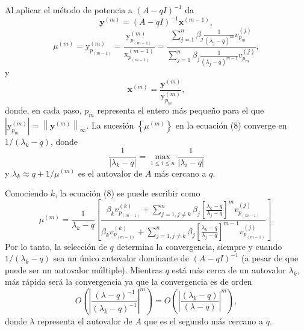 \documentclass{report}
\numberwithin{subsection}{section} %
\begin{document}
Al aplicar el método de potencia a $\left( A - qI \right)^{-1}$ da
\begin{equation*}
\textbf{y}^{\left( m \right)} = \left( A - qI \right)^{-1} \textbf{x}^{\left( m - 1 \right)},
\end{equation*}
\begin{equation}
\mu^{\left( m \right)} = \text{y}_{p_{\left( m - 1 \right)}}^{\left( m \right)} = \frac{\text{y}_{p_{\left( m - 1 \right)}}^{\left( m \right)}}{\text{x}_{p_{\left( m - 1 \right)}}^{\left( m - 1 \right)}} = \frac{\sum_{j=1}^{n} \beta_{j} \frac{1}{\left( \lambda_{j} - q \right)^{m}} v_{p_{m}}^{\left( j \right)}}{\sum_{j=1}^{n} \beta_{j} \frac{1}{\left( \lambda_{j} - q \right)^{m-1}} v_{p_{m}}^{\left( j \right)}},
\end{equation}
y
\begin{equation*}
\textbf{x}^{\left( m \right)} = \frac{\textbf{y}^{\left( m \right)}}{\text{y}_{p_{m}}^{\left( m \right)}},
\end{equation*}
donde, en cada paso, $p_{m}$ representa el entero más pequeño para el que $\left| \text{y}_{p_{m}}^{\left( m \right)} \right| = \left\| \textbf{y}^{\left( m \right)} \right\|_{\infty }$. La sucesión $\left\{ \mu^{\left( m \right)} \right\}$ en la ecuación (8) converge en $1 / \left( \lambda_{k} - q \right)$, donde
\begin{equation*}
\frac{1}{\left| \lambda_{k} - q \right|} =\max_{1\le i\le n} \frac{1}{\left| \lambda_{i} - q \right|}
\end{equation*}
y $\lambda_{k} \approx q + 1 / \mu^{\left( m \right)}$ es el autovalor de $A$ más cercano a $q$.

Conociendo $k$, la ecuación (8) se puede escribir como
\begin{equation}
\mu^{\left( m \right)} = \frac{1}{\lambda_{k} - q} \left[ \frac{\beta_{k} v_{p_{\left( m - 1 \right)}}^{\left( k \right)} + 
\sum_{j=1, j\neq k}^{n} \beta_{j} \left[ \frac{\lambda_{k} - q}{\lambda_{j} - q} \right]^{m} v_{p_{\left( m - 1 \right)}}^{\left( j \right)}}{\beta_{k} v_{p_{\left( m - 1 \right)}}^{\left( k \right)} + 
\sum_{j=1, j\neq k}^{n} \beta_{j} \left[ \frac{\lambda_{k} - q}{\lambda_{j} - q} \right]^{m-1} v_{p_{\left( m - 1 \right)}}^{\left( j \right)}} \right].
\end{equation}
Por lo tanto, la selección de $q$ determina la convergencia, siempre y cuando $1 / \left( \lambda_{k} - q \right)$ sea un único autovalor dominante de $\left( A - qI \right)^{-1}$ (a pesar de que puede ser un autovalor múltiple). Mientras $q$ está más cerca de un autovalor $\lambda_{k}$, más rápida será la convergencia ya que la convergencia es de orden
\begin{equation*}
O\left( \left| \frac{\left( \lambda - q \right)^{-1}}{\left( \lambda_{k} - q \right)^{-1}} \right|^{m} \right) = O \left( \left| \frac{\left( \lambda_{k} - q \right)}{\left( \lambda - q \right)} \right|^{m} \right),
\end{equation*}
donde $\lambda$ representa el autovalor de $A$ que es el segundo más cercano a $q$.
\end{document}
